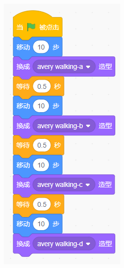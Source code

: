 \documentclass[10pt, a4paper]{article}
\begin{document}
\begin{enumerate}
\begin{figure}[htbp]
\begin{minipage}[t]{.58\textwidth}
\begin{minipage}[t]{.13\textwidth}
                \end{minipage}
                \begin{minipage}[t]{.2\textwidth}
                    \centering
                    \includegraphics[width=\textwidth]{19-2.png}

\end{minipage}
\end{minipage}
\end{figure}
\end{enumerate}
\end{document}

